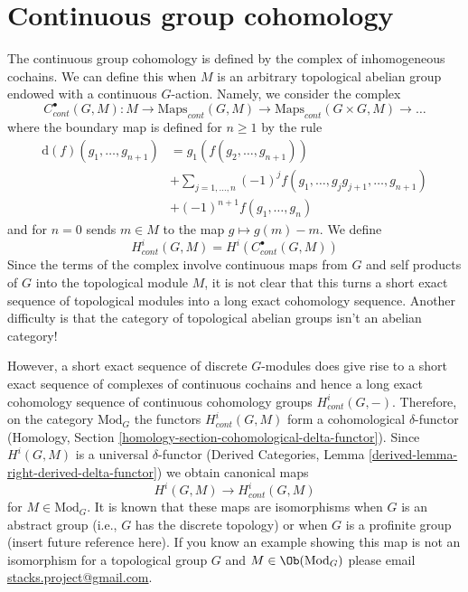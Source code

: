 \section{Continuous group cohomology}
\label{section-continuous-group-cohomology}

\noindent
The continuous group cohomology is defined by the complex of
inhomogeneous cochains. We can define this when $M$ is an
arbitrary topological abelian group endowed with a continuous $G$-action.
Namely, we consider the complex
$$
C^\bullet_{cont}(G, M) :
M \to \text{Maps}_{cont}(G, M) \to
\text{Maps}_{cont}(G \times G, M) \to \ldots
$$
where the boundary map is defined for $n \geq 1$ by the rule
\begin{align*}
\text{d}(f)(g_1, \ldots, g_{n + 1})
& = g_1(f(g_2, \ldots, g_{n + 1})) \\
&
+ \sum\nolimits_{j = 1, \ldots, n}
(-1)^jf(g_1, \ldots, g_jg_{j + 1}, \ldots, g_{n + 1}) \\
&
+ (-1)^{n + 1}f(g_1, \ldots, g_n)
\end{align*}
and for $n = 0$ sends $m \in M$ to the map $g \mapsto g(m) - m$. We define
$$
H^i_{cont}(G, M) = H^i(C^\bullet_{cont}(G, M))
$$
Since the terms of the complex involve continuous maps from $G$ and
self products of $G$ into the topological module $M$, it is not clear
that this turns a short exact sequence of topological modules into
a long exact cohomology sequence. Another difficulty is that the category
of topological abelian groups isn't an abelian category!

\medskip\noindent
However, a short exact sequence of discrete $G$-modules does give
rise to a short exact sequence of complexes of continuous cochains
and hence a long exact cohomology sequence of continuous
cohomology groups $H^i_{cont}(G, -)$.
Therefore, on the category $\text{Mod}_G$ the functors
$H^i_{cont}(G, M)$ form a cohomological $\delta$-functor
(Homology, Section \ref{homology-section-cohomological-delta-functor}).
Since $H^i(G, M)$ is a universal $\delta$-functor
(Derived Categories, Lemma \ref{derived-lemma-right-derived-delta-functor})
we obtain canonical maps
$$
H^i(G, M) \longrightarrow H^i_{cont}(G, M)
$$
for $M \in \text{Mod}_G$. It is known that these maps are
isomorphisms when $G$ is an abstract group (i.e., $G$ has
the discrete topology) or when $G$ is a profinite group
(insert future reference here).
If you know an example showing this map is not an isomorphism
for a topological group $G$ and $M \in \Ob(\text{Mod}_G)$
please email
\href{mailto:stacks.project@gmail.com}{stacks.project@gmail.com}.




